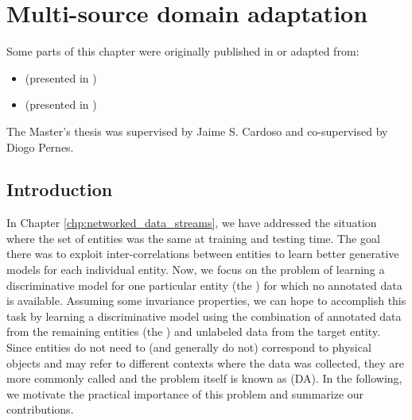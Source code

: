 
\chapter{Multi-source domain adaptation}


\label{chp:domain_adaptation}


\begin{tcolorbox}
	\small{
		Some parts of this chapter were originally published in or adapted from:
		\begin{itemize}
			\item[] \cite{ThesisFrancisco}  (presented in )
			\item[] \cite{MODAFM}  (presented in )
		\end{itemize}

		The Master's thesis \cite{ThesisFrancisco} was supervised by Jaime S. Cardoso and co-supervised by Diogo Pernes.
	}
\end{tcolorbox}

\section{Introduction}
\label{sec:chp3_intro}
In Chapter \ref{chp:networked_data_streams}, we have addressed the situation where the set of entities was the same at training and testing time. The goal there was to exploit inter-correlations between entities to learn better generative models for each individual entity. Now, we focus on the problem of learning a discriminative model for one particular entity (the ) for which no annotated data is available. Assuming some invariance properties, we can hope to accomplish this task by learning a discriminative model using the combination of annotated data from the remaining entities (the ) and unlabeled data from the target entity. Since entities do not need to (and generally do not) correspond to physical objects and may refer to different contexts where the data was collected, they are more commonly called  and the problem itself is known as  (DA). In the following, we motivate the practical importance of this problem and summarize our contributions.

